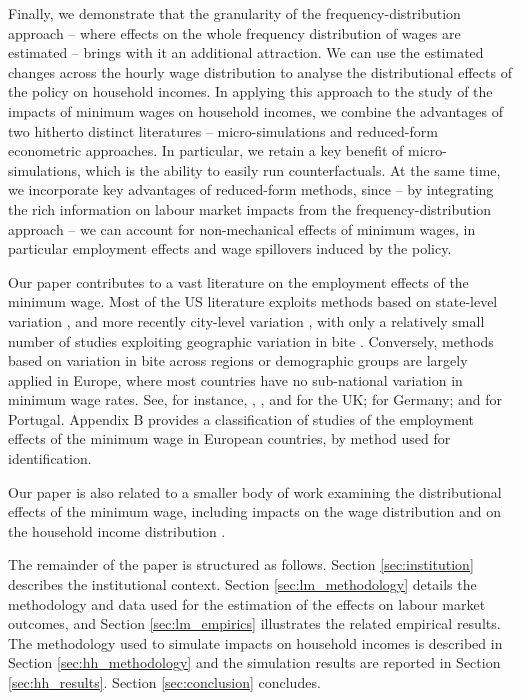 Finally, we demonstrate that the granularity of the frequency-distribution approach -- where effects on the whole frequency distribution of wages are estimated -- brings with it an additional attraction. We can use the estimated changes across the hourly wage distribution to analyse the distributional effects of the policy on household incomes. In applying this approach to the study of the impacts of minimum wages on household incomes, we combine the advantages of two hitherto distinct literatures -- micro-simulations and reduced-form econometric approaches. In particular, we retain a key benefit of micro-simulations, which is the ability to easily run counterfactuals. At the same time, we incorporate key advantages of reduced-form methods, since -- by integrating the rich information on labour market impacts from the frequency-distribution approach -- we can account for non-mechanical effects of minimum wages, in particular employment effects and wage spillovers induced by the policy. \par

Our paper contributes to a vast literature on the employment effects of the minimum wage. Most of the US literature exploits methods based on state-level variation \citep{CardKrueger1994, CardKrueger2000, NeumarkWascher2008, DubeLesterReich2010, NeumarkSalasWascher2014, Cengiz2019}, and more recently city-level variation \citep{DubeLindner2021}, with only a relatively small number of studies exploiting geographic variation in bite \citep{Card1992,ClemensWither2019}. Conversely, methods based on variation in bite across regions or demographic groups are largely applied in Europe, where most countries have no sub-national variation in minimum wage rates. See, for instance, \cite{Stewart2002}, \cite{Dolton2012}, \cite{Dolton2015} and \cite{Dube2019b} for the UK; \citet{Dustmann2021} for Germany; and \cite{PortugalCardoso2006} for Portugal. Appendix B provides a classification of studies of the employment effects of the minimum wage in European countries, by method used for identification.

Our paper is also related to a smaller body of work examining the distributional effects of the minimum wage, including impacts on the wage distribution \citep{DiNardo1996,Lee1999,AutorManningSmith2016,Cengiz2019} and on the household income distribution \citep{Dube2019}.

The remainder of the paper is structured as follows. Section \ref{sec:institution} describes the institutional context. Section \ref{sec:lm_methodology} details the methodology and data used for the estimation of the effects on labour market outcomes, and Section \ref{sec:lm_empirics} illustrates the related empirical results. The methodology used to simulate impacts on household incomes is described in Section \ref{sec:hh_methodology} and the simulation results are reported in Section \ref{sec:hh_results}. Section \ref{sec:conclusion} concludes. \par


